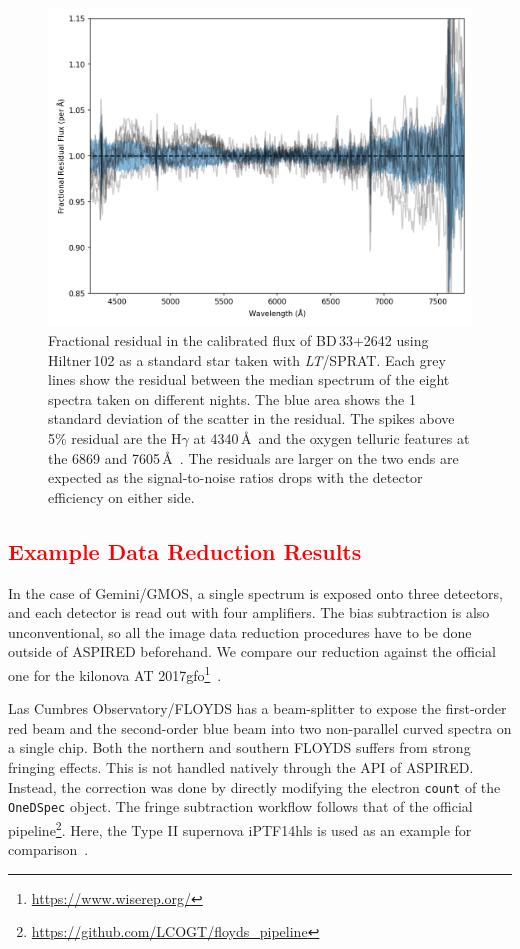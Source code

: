 \documentclass[linenumbers, twocolumn]{aastex631}
\begin{document}
\begin{figure}
    \centering
    \includegraphics[width=\columnwidth]{fig_08_sprat_standards_compared.png}
    \caption{Fractional residual in the calibrated flux of BD\,33+2642 using
    Hiltner\,102 as a standard star taken with \textit{LT}/SPRAT. Each grey
    lines show the residual between the median spectrum of the eight spectra
    taken on different nights. The blue area shows the 1 standard deviation
    of the scatter in the residual. The spikes above 5\% residual are the
    H$\gamma$ at 4340\,\AA\ and the oxygen telluric features at the 6869 and
    7605\,\AA\ . The residuals are larger on the two ends are expected as
    the signal-to-noise ratios drops with the detector efficiency on either
    side.}
    \label{fig:repeatability}
\end{figure}

\textcolor{red}{\subsection{Example Data Reduction Results}}
\label{sec:examples}
In the case of Gemini/GMOS, a single spectrum is exposed onto
three detectors, and each detector is read out with four amplifiers. The bias 
subtraction is also unconventional, so all the image data reduction procedures
have to be done outside of \textsc{ASPIRED} beforehand. We compare our reduction against
the official one for the kilonova AT 2017gfo\footnote{\url{https://www.wiserep.org/}}~\citep{2017ApJ...848L..32M}. 

Las Cumbres Observatory/FLOYDS has a beam-splitter to expose the first-order
red beam and the second-order blue beam into two non-parallel
curved spectra on a single chip. Both the northern and southern FLOYDS suffers
from strong fringing effects. This is not handled natively through the API of 
\textsc{ASPIRED}. Instead, the correction was done by directly modifying the
electron \texttt{count} of the \texttt{OneDSpec} object. The fringe subtraction
workflow follows that of the official
pipeline\footnote{\url{https://github.com/LCOGT/floyds_pipeline}}. Here, the
Type II supernova iPTF14hls is used as an example for
comparison~\citep{2017Natur.551..210A}.
\end{document}
